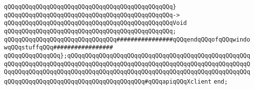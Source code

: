 \verb|qQQqqQQqqQQqqQQqqQQqqQQqqQQqqQQqqQQqqQQqqQQqqQQq}|\newline
\verb|qQQqqQQqqQQqqQQqqQQqqQQqqQQqqQQqqQQqqQQqqQQqqQQq->|\newline
\verb|qQQqqQQqqQQqqQQqqQQqqQQqqQQqqQQqqQQqqQQqqQQqqQQqVoid|\newline
\verb|qQQqqQQqqQQqqQQqqQQqqQQqqQQqqQQqqQQqqQQqqQQqqQQq;|\newline
\newline
\verb|qQQqqQQqqQQqqQQqqQQqqQQqqQQqqQQq################qQQqendqQQqofqQQqwindowqQQqstuffqQQq#################|\newline
\newline
\verb|qQQqqQQqqQQqqQQq};qQQqqQQqqQQqqQQqqQQqqQQqqQQqqQQqqQQqqQQqqQQqqQQqqQQqqQQqqQQqqQQqqQQqqQQqqQQqqQQqqQQqqQQqqQQqqQQqqQQqqQQqqQQqqQQqqQQqqQQqqQQqqQQqqQQqqQQqqQQqqQQqqQQqqQQqqQQqqQQqqQQqqQQqqQQqqQQqqQQqqQQqqQQqqQQqqQQqqQQqqQQqqQQqqQQqqQQqqQQqqQQqqQQqqQQq#qQQqapiqQQqXclient|\newline
\verb|end;|\newline
\newline
\newline

